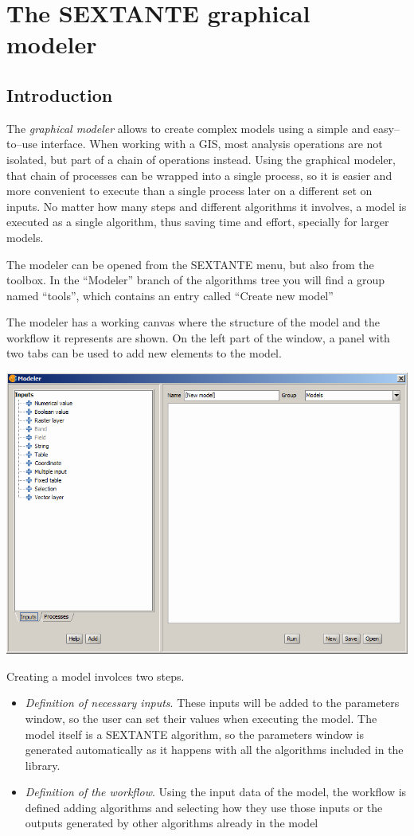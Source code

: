 \chapter{The SEXTANTE graphical modeler}

\section{Introduction}

The \emph{graphical modeler} allows to create complex models using a simple and easy--to--use interface. When working with a GIS, most analysis operations are not isolated, but part of a chain of operations instead. Using the graphical modeler, that chain of processes can be wrapped into a single process, so it is easier and more convenient to execute than a single process later on a different set on inputs. No matter how many steps and different algorithms it involves, a model is executed as a single algorithm, thus saving time and effort, specially for larger models.

The modeler can be opened from the SEXTANTE menu, but also from the toolbox. In the ``Modeler'' branch of the algorithms tree you will find a group named ``tools'', which contains an entry called ``Create new model''

The modeler has a working canvas where the structure of the model and the workflow it represents are shown. On the left part of the window, a panel with two tabs can be used to add new elements to the model.

\begin{center}
\includegraphics[width=.8\columnwidth]{graphical_modeler.png}
\end{center}

Creating a model involces two steps.

\begin{itemize}
	\item \emph{Definition of necessary inputs}. These inputs will be added to the parameters window, so the user can set their values when executing the model. The model itself is a SEXTANTE algorithm, so the parameters window is generated automatically as it happens with all the algorithms included in the library.
	\item \emph{Definition of the workflow}. Using the input data of the model, the workflow is defined adding algorithms and selecting how they use those inputs or the outputs generated by other algorithms already in the model 
\end{itemize}


